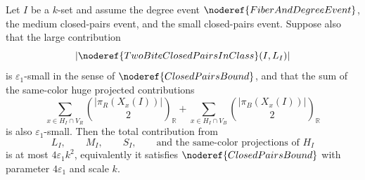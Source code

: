 \begin{lemma}
Let \(I\) be a \(k\)-set and assume the degree event
\(\noderef{FiberAndDegreeEvent}\), the medium closed-pairs event, and the small
closed-pairs event.  Suppose also that the large contribution
\[
|\noderef{TwoBiteClosedPairsInClass}(I,L_I)|
\]
is \(\varepsilon_1\)-small in the sense of
\(\noderef{ClosedPairsBound}\), and that the sum of the same-color huge
projected contributions
\[
\sum_{x\in H_I\cap V_R}\binom{|\pi_R(X_x(I))|}{2}_{\mathbb R}
+
\sum_{x\in H_I\cap V_B}\binom{|\pi_B(X_x(I))|}{2}_{\mathbb R}
\]
is also \(\varepsilon_1\)-small.  Then the total contribution from
\[
L_I,\qquad M_I,\qquad S_I,\qquad
\text{and the same-color projections of }H_I
\]
is at most \(4\varepsilon_1k^2\), equivalently it satisfies
\(\noderef{ClosedPairsBound}\) with parameter \(4\varepsilon_1\) and scale
\(k\).
\end{lemma}
